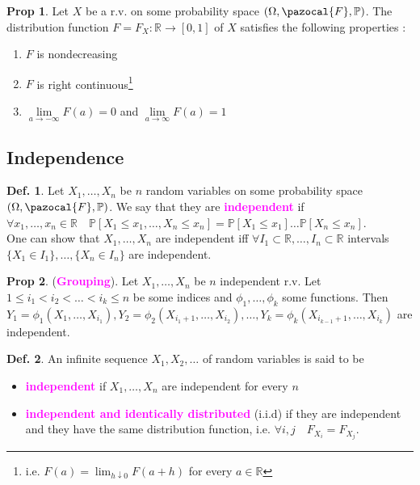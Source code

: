 \documentclass[8pt,a4paper,landscape]{article}
\theoremstyle{definition}
\newtheorem{definition}{Def.}[section]
\theoremstyle{example}
\theoremstyle{intuition}
\theoremstyle{definition}
\newtheorem{proposition}{Prop}[section]
\newcommand{\Fb}{\pazocal{F}}
\newcommand{\mydef}[1]{\textcolor{magenta}{\textbf{#1}}}
\newcommand{\prob}[1]{\mathbb{P}\left[ #1 \right]}
\begin{document}
\begin{multicols}{3}
				 \begin{proposition} \label{FX-conditions}
				 	Let $X$ be a r.v. on some probability space $(\Omega, \Fb, \mathbb{P})$. The distribution function $F = F_X : \mathbb{R} \to \left[0,1\right]$ of $X$ satisfies the following properties :
					\begin{enumerate}[label=\roman*.] \label{F_3points}
				 		\item $F$ is nondecreasing
				 		\item $F$ is right continuous\footnote{i.e. $F(a) = \lim_{h \downarrow 0}F(a+h)$ for every $a \in \mathbb{R}$}
				 		\item $\lim\limits_{a \rightarrow -\infty} F(a) = 0$ and $\lim\limits_{a \rightarrow \infty} F(a) = 1$
				 	\end{enumerate}
				 \end{proposition}
				 
				 
			\subsection{Independence}
				
				\begin{definition}
					Let $X_1, \ldots, X_n$ be $n$ random variables on some probability space $(\Omega, \Fb, \mathbb{P})$. We say that they are \mydef{independent} if
					$
						\forall x_1, \ldots, x_n \in \mathbb{R} \quad \prob{X_1 \leq x_1, \ldots, X_n \leq x_n} 
						= \prob{X_1 \leq x_1} \ldots \prob{X_n \leq x_n}
					$.\\
					One can show that $X_1, \ldots, X_n$ are independent iff $\forall I_1 \subset \mathbb{R}, \ldots, I_n \subset \mathbb{R}$ intervals $\{X_1 \in I_1\}, \ldots, \{X_n \in I_n\}$ are independent.
				\end{definition}
				
				\begin{proposition}
					(\mydef{Grouping}). Let $X_1, \ldots, X_n$ be $n$ independent r.v. Let $1 \leq i_1 < i_2 < \ldots < i_k \leq n$ be some indices and $\phi_1, \ldots, \phi_k$ some functions. Then 
					$Y_1 = \phi_1 (X_1, \ldots, X_{i_1}), Y_2 = \phi_2(X_{i_1 + 1}, \ldots, X_{i_2}), \ldots, Y_k = \phi_k (X_{i_{k-1}+1}, \ldots, X_{i_k})$
					are independent.
				\end{proposition}
				
				\begin{definition}
					An infinite sequence $X_1, X_2, \ldots$ of random variables is said to be 
					\begin{itemize}
						\item \mydef{independent} if $X_1, \ldots, X_n$ are independent for every $n$
						\item \mydef{independent and identically distributed} (i.i.d) if they are independent and they have the same distribution function, i.e. $\forall i,j \quad F_{X_i} = F_{X_j}$.
					\end{itemize}
				\end{definition}
				

\end{multicols}
\end{document}
